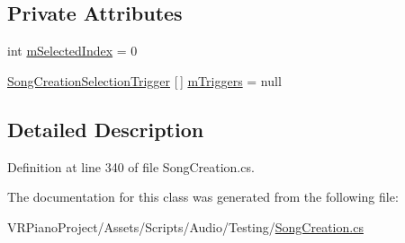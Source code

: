 \subsection*{Private Attributes}
\begin{DoxyCompactItemize}
\item 
int \hyperlink{group___s_c_handlers_ga33015c7ac7e8cebb24b1fc97c70b4ed7}{m\+Selected\+Index} = 0
\item 
\hyperlink{group___s_c_handlers_class_song_creation_1_1_song_creation_selection_container_1_1_song_creation_selection_trigger}{Song\+Creation\+Selection\+Trigger} \mbox{[}$\,$\mbox{]} \hyperlink{group___s_c_handlers_ga89fbb92f878e65f27bee6edbf920da22}{m\+Triggers} = null
\end{DoxyCompactItemize}


\subsection{Detailed Description}


Definition at line 340 of file Song\+Creation.\+cs.



The documentation for this class was generated from the following file\+:\begin{DoxyCompactItemize}
\item 
V\+R\+Piano\+Project/\+Assets/\+Scripts/\+Audio/\+Testing/\hyperlink{_song_creation_8cs}{Song\+Creation.\+cs}\end{DoxyCompactItemize}
